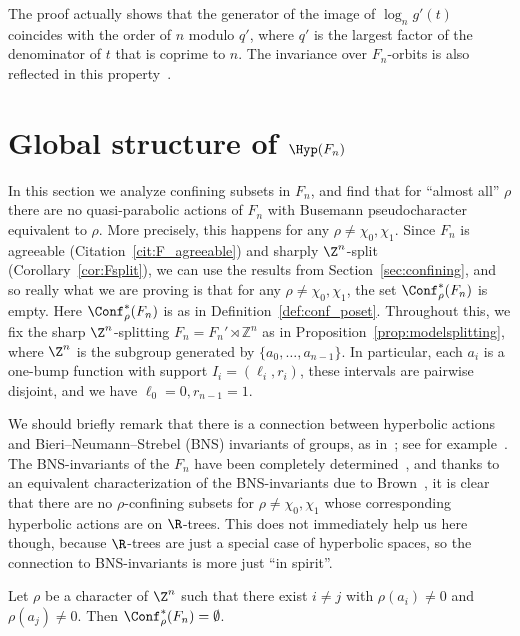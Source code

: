 \begin{rema}
The proof actually shows that the generator of the image of $\log_n g'(t)$ coincides with the order of $n$ modulo $q'$, where $q'$ is the largest factor of the denominator of $t$ that is coprime to $n$. The invariance over $F_n$-orbits is also reflected in this property~\cite{hydelodha}.
\end{rema}

\section{Global structure of \texorpdfstring{$\Hyp(F_n)$}{Hyp(Fn)}}\label{sec:global}

In this section we analyze confining subsets in $F_n$, and find that for ``almost all'' $\rho$ there are no quasi-parabolic actions of $F_n$ with Busemann pseudocharacter equivalent to $\rho$. More precisely, this happens for any $\rho\ne \chi_0,\chi_1$. Since $F_n$ is agreeable (Citation~\ref{cit:F_agreeable}) and sharply $\Z^n$-split (Corollary~\ref{cor:Fsplit}), we can use the results from Section~\ref{sec:confining}, and so really what we are proving is that for any $\rho\ne \chi_0,\chi_1$, the set $\Conf^\ast_\rho(F_n)$ is empty. Here $\Conf^\ast_\rho(F_n)$ is as in Definition~\ref{def:conf_poset}. Throughout this, we fix the sharp $\Z^n$-splitting $F_n = F_n' \rtimes \mathbb{Z}^n$ as in Proposition~\ref{prop:modelsplitting}, where $\Z^n$ is the subgroup generated by $\{a_0,\dots,a_{n-1}\}$. In particular, each $a_i$ is a one-bump function with support $I_i = (\ell_i, r_i)$, these intervals are pairwise disjoint, and we have $\ell_0 = 0, r_{n-1} = 1$.

We should briefly remark that there is a connection between hyperbolic actions and Bieri--Neumann--Strebel (BNS) invariants of groups, as in~\cite{bieri87}; see for example~\cite[Subsection~4.3]{confining}. The BNS-invariants of the $F_n$ have been completely determined~\cite[Theorem~8.1]{bieri87}, and thanks to an equivalent characterization of the BNS-invariants due to Brown~\cite[Corollary~7.4]{brown87trees}, it is clear that there are no $\rho$-confining subsets for $\rho \neq \chi_0, \chi_1$ whose corresponding hyperbolic actions are on $\R$-trees. This does not immediately help us here though, because $\R$-trees are just a special case of hyperbolic spaces, so the connection to BNS-invariants is more just ``in spirit''.

\begin{prop}\label{prop:usually_empty_conf}
Let $\rho$ be a character of $\Z^n$ such that there exist $i\ne j$ with $\rho(a_i)\ne 0$ and $\rho(a_j)\ne 0$. Then $\Conf^\ast_\rho(F_n)=\emptyset$.
\end{prop}


